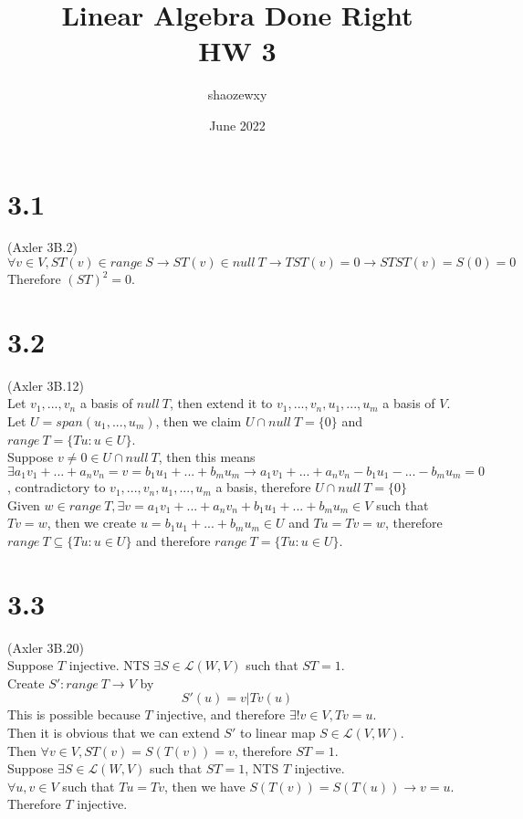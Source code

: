 \documentclass{article}
\title{Linear Algebra Done Right\\
\large{HW 3}}
\author{shaozewxy }
\date{June 2022}
\begin{document}
\maketitle

\setcounter{secnumdepth}{0}
\section{3.1}
(Axler 3B.2)\\
$\forall v \in V, ST(v) \in range\ S \rightarrow ST(v) \in null\ T \rightarrow TST(v) = 0 \rightarrow STST(v) = S(0) = 0$\\
Therefore $(ST)^2 = 0$.
\section{3.2}
(Axler 3B.12)\\
Let $v_1, ..., v_n$ a basis of $null\ T$, then extend it to $v_1, ..., v_n, u_1, ..., u_m$ a basis of $V$.\\
Let $U = span(u_1, ..., u_m)$, then we claim $U \cap null\ T = \{0\}$ and $range\ T = \{Tu:u \in U\}$.\\
Suppose $v \neq 0 \in U \cap null\ T$, then this means $\exists a_1v_1 + ... + a_nv_n = v = b_1u_1 + ... + b_mu_m \rightarrow a_1v_1 + ... + a_nv_n - b_1u_1 - ... - b_mu_m = 0$, contradictory to $v_1, ..., v_n, u_1, ..., u_m$ a basis, therefore $U \cap null\ T = \{0\}$\\
Given $w \in range\ T, \exists v = a_1v_1 + ... + a_nv_n + b_1u_1 + ... + b_mu_m \in V$ such that $ Tv = w$, then we create $u = b_1u_1 + ... + b_mu_m \in U$ and $Tu = Tv = w$, therefore $range\ T \subseteq \{Tu: u \in U\}$ and therefore $range\ T = \{Tu: u \in U\}$.
\section{3.3}
(Axler 3B.20)\\
Suppose $T$ injective. NTS $\exists S \in \mathcal{L}(W, V)$ such that $ST = 1$.\\
Create $S':range\ T \rightarrow V$ by
\begin{equation*}
    S'(u) = v | Tv(u)
\end{equation*}
This is possible because $T$ injective, and therefore $\exists ! v \in V, Tv = u$.\\
Then it is obvious that we can extend $S'$ to linear map $S \in \mathcal{L}(V, W)$.\\
Then $\forall v \in V, ST(v) = S(T(v)) = v$, therefore $ST = 1$.\\
Suppose $\exists S \in \mathcal{L}(W, V)$ such that $ST = 1$, NTS $T$ injective.\\
$\forall u, v \in V$ such that $Tu = Tv$, then we have $S(T(v)) = S(T(u)) \rightarrow v = u$. Therefore $T$ injective.
\end{document}
